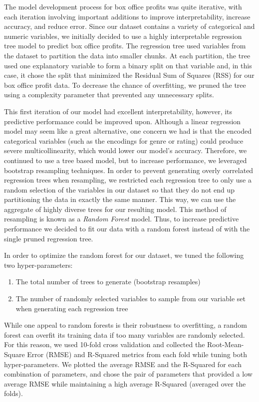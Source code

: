 \documentclass[10pt]{article}
\begin{document}
The model development process for box office profits was quite iterative, with each iteration involving important additions to improve interpretability, increase accuracy, and reduce error. Since our dataset contains a variety of categorical and numeric variables, we initially decided to use a highly interpretable regression tree model to predict box office profits. The regression tree used variables from the dataset to partition the data into smaller chunks. At each partition, the tree used one explanatory variable to form a binary split on that variable and, in this case, it chose the split that minimized the Residual Sum of Squares (RSS) for our box office profit data. To decrease the chance of overfitting, we pruned the tree using a complexity parameter that prevented any unnecessary splits. 

This first iteration of our model had excellent interpretability, however, its predictive performance could be improved upon. Although a linear regression model may seem like a great alternative, one concern we had is that the encoded categorical variables (such as the encodings for genre or rating) could produce severe multicollinearity, which would lower our model’s accuracy. Therefore, we continued to use a tree based model, but to increase performance, we leveraged bootstrap resampling techniques. In order to prevent generating overly correlated regression trees when resampling, we restricted each regression tree to only use a random selection of the variables in our dataset so that they do not end up partitioning the data in exactly the same manner. This way, we can use the aggregate of highly diverse trees for our resulting model. This method of resampling is known as a \textit{Random Forest} model. Thus, to increase predictive performance we decided to fit our data with a random forest instead of with the single pruned regression tree. 

In order to optimize the random forest for our dataset, we tuned the following two hyper-parameters:

\begin{enumerate}
\item The total number of trees to generate (bootstrap resamples) 
\item The number of randomly selected variables to sample from our variable set when generating each regression tree
\end{enumerate}

While one appeal to random forests is their robustness to overfitting, a random forest can overfit its training data if too many variables are randomly selected. For this reason, we used 10-fold cross validation and collected the Root-Mean-Square Error (RMSE) and R-Squared metrics from each fold while tuning both hyper-parameters. We plotted the average RMSE and the R-Squared for each combination of parameters, and chose the pair of parameters that provided a low average RMSE while maintaining a high average R-Squared (averaged over the folds). 
\end{document}
